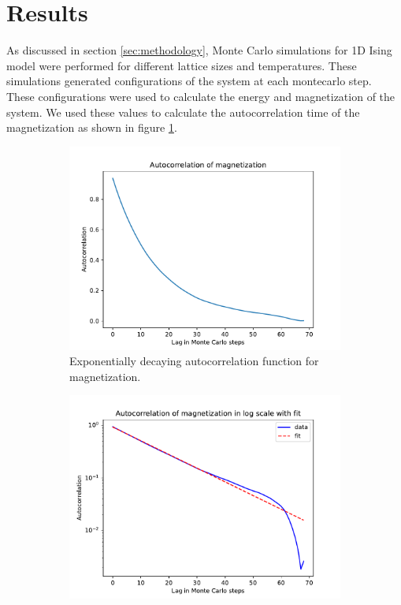 \section{Results}
\label{sec:results}

As discussed in section \ref{sec:methodology}, Monte Carlo simulations for 1D
Ising model were performed for different lattice sizes and temperatures. These
simulations generated configurations of the system at each montecarlo step.
These configurations were used to calculate the energy and magnetization of the
system. We used these values to calculate the autocorrelation time of the
magnetization as shown in figure \ref{fig:acf_mag}. 

\begin{figure}[ht]
    \centering
    \begin{subfigure}{0.45\textwidth}
        \includegraphics[width=\textwidth]{../plots/acf_mag.pdf}
        \caption{Exponentially decaying autocorrelation function for magnetization.}
        \label{fig:acf_mag}
    \end{subfigure}
    \hfill
    \begin{subfigure}{0.45\textwidth}
        \includegraphics[width=\textwidth]{../plots/acf_mag_fit.pdf}

\end{subfigure}
\end{figure}
